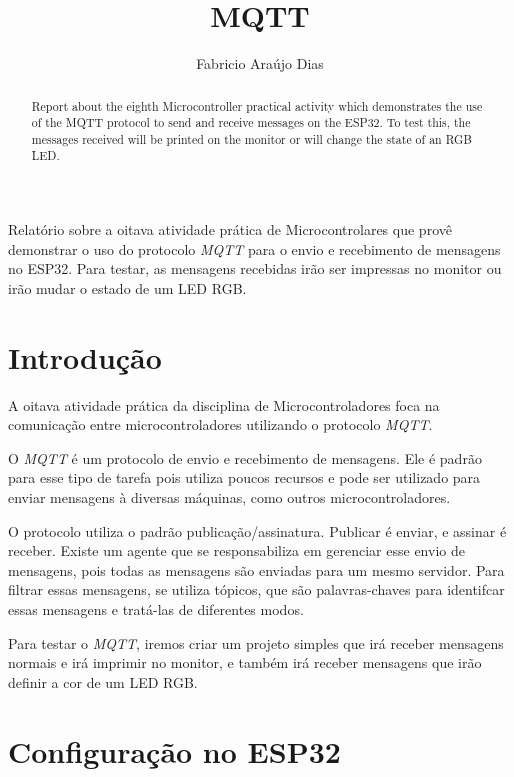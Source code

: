 \documentclass[12pt]{article}
\title{MQTT}
\author{Fabricio Araújo Dias}
\begin{document}
 

\maketitle

\begin{abstract}
    Report about the eighth Microcontroller practical activity which demonstrates the use of the MQTT protocol to send and receive messages on the ESP32. To test this, the messages received will be printed on the monitor or will change the state of an RGB LED.
\end{abstract}
     
\begin{resumo} 
    Relatório sobre a oitava atividade prática de Microcontrolares que provê demonstrar o uso do protocolo \textit{MQTT} para o envio e recebimento de mensagens no ESP32. Para testar, as mensagens recebidas irão ser impressas no monitor ou irão mudar o estado de um LED RGB.
\end{resumo}

\section{Introdução}

A oitava atividade prática da disciplina de Microcontroladores foca na comunicação entre microcontroladores utilizando o protocolo \textit{MQTT}.

O \textit{MQTT} é um protocolo de envio e recebimento de mensagens. Ele é padrão para esse tipo de tarefa pois utiliza poucos recursos e pode ser utilizado para enviar mensagens à diversas máquinas, como outros microcontroladores. 

O protocolo utiliza o padrão publicação/assinatura. Publicar é enviar, e assinar é receber. Existe um agente que se responsabiliza em gerenciar esse envio de mensagens, pois todas as mensagens são enviadas para um mesmo servidor. Para filtrar essas mensagens, se utiliza tópicos, que são palavras-chaves para identifcar essas mensagens e tratá-las de diferentes modos.

Para testar o \textit{MQTT}, iremos criar um projeto simples que irá receber mensagens normais e irá imprimir no monitor, e também irá receber mensagens que irão definir a cor de um LED RGB.

\section{Configuração no ESP32}
\end{document}
